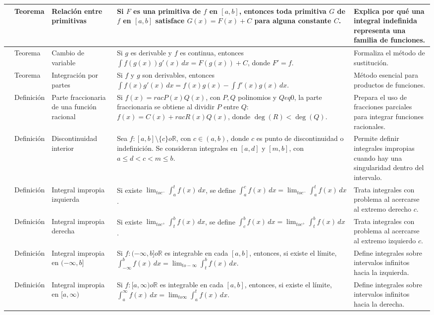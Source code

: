 \documentclass[10pt,landscape]{article}
\begin{document}
\begin{longtable}{|>{\centering\arraybackslash}p{0.7cm}|>{\centering\arraybackslash}p{2.4cm}|p{4.2cm}|p{11.8cm}|p{7.2cm}|}
25 & Teorema & Relación entre primitivas & Si $F$ es una primitiva de $f$ en $[a,b]$, entonces toda primitiva $G$ de $f$ en $[a,b]$ satisface $G(x)=F(x)+C$ para alguna constante $C$. & Explica por qué una integral indefinida representa una familia de funciones. \\ \hline
26 & Teorema & Cambio de variable & Si $g$ es derivable y $f$ es continua, entonces $\int f(g(x))g'(x)\,dx=F(g(x))+C$, donde $F'=f$. & Formaliza el método de sustitución. \\ \hline
27 & Teorema & Integración por partes & Si $f$ y $g$ son derivables, entonces $\int f(x)g'(x)\,dx=f(x)g(x)-\int f'(x)g(x)\,dx$. & Método esencial para productos de funciones. \\ \hline
28 & Definición & Parte fraccionaria de una función racional & Si $f(x)=rac{P(x)}{Q(x)}$, con $P,Q$ polinomios y $Q
eq0$, la parte fraccionaria se obtiene al dividir $P$ entre $Q$: $f(x)=C(x)+rac{R(x)}{Q(x)}$, donde $\deg(R)<\deg(Q)$. & Prepara el uso de fracciones parciales para integrar funciones racionales. \\ \hline
29 & Definición & Discontinuidad interior & Sea $f:[a,b]\setminus\{c\}	o\mathbb{R}$, con $c\in(a,b)$, donde $c$ es punto de discontinuidad o indefinición. Se consideran integrales en $[a,d]$ y $[m,b]$, con $a\leq d<c<m\leq b$. & Permite definir integrales impropias cuando hay una singularidad dentro del intervalo. \\ \hline
30 & Definición & Integral impropia izquierda & Si existe $\lim_{t	o c^-}\int_a^t f(x)\,dx$, se define $\int_a^c f(x)\,dx=\lim_{t	o c^-}\int_a^t f(x)\,dx$. & Trata integrales con problema al acercarse al extremo derecho $c$. \\ \hline
31 & Definición & Integral impropia derecha & Si existe $\lim_{t	o c^+}\int_t^b f(x)\,dx$, se define $\int_c^b f(x)\,dx=\lim_{t	o c^+}\int_t^b f(x)\,dx$. & Trata integrales con problema al acercarse al extremo izquierdo $c$. \\ \hline
32 & Definición & Integral impropia en $(-\infty,b]$ & Si $f:(-\infty,b]	o\mathbb{R}$ es integrable en cada $[a,b]$, entonces, si existe el límite, $\int_{-\infty}^b f(x)\,dx=\lim_{t	o-\infty}\int_t^b f(x)\,dx$. & Define integrales sobre intervalos infinitos hacia la izquierda. \\ \hline
33 & Definición & Integral impropia en $[a,\infty)$ & Si $f:[a,\infty)	o\mathbb{R}$ es integrable en cada $[a,b]$, entonces, si existe el límite, $\int_a^\infty f(x)\,dx=\lim_{t	o\infty}\int_a^t f(x)\,dx$. & Define integrales sobre intervalos infinitos hacia la derecha. \\ \hline
\end{longtable}
\end{document}
